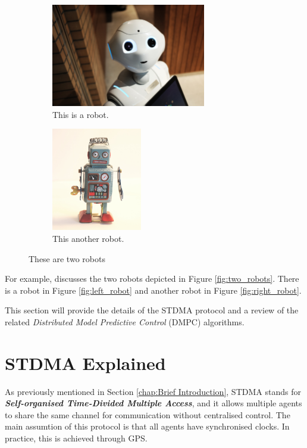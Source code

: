 {\begin{figure}[htb]
\centering
\begin{subfigure}[t]{.5\textwidth}
  \centering
  \includegraphics[height=4.5cm]{figures/Robot_1.jpg}
  \caption{\label{fig:left_robot} This is a robot.}
  \label{fig:theoretical}
\end{subfigure}%
\begin{subfigure}[t]{.5\textwidth}
  \centering
  \includegraphics[height=4.5cm]{figures/Robot_2.jpg}
  \caption{\label{fig:right_robot} This another robot.}
  \label{fig:practical}
\end{subfigure}
\caption{\label{fig:two_robots} These are two robots}
\label{fig:test}
\end{figure}

For example, \cite{Robots2020} discusses the two robots depicted in Figure \ref{fig:two_robots}. There is a robot in Figure \ref{fig:left_robot} and another robot in Figure \ref{fig:right_robot}.

}

This section will provide the details of the STDMA\cite{STDMA} protocol and a review of the related \textit{Distributed Model Predictive Control} (DMPC) algorithms.

\section{STDMA Explained}

\label{chap:STDMA Explained}

As previously mentioned in Section \ref{chap:Brief Introduction}, STDMA stands for \textbf{\textit{Self-organised Time-Divided Multiple Access}}, and it allows multiple agents to share the same channel for communication without centralised control.
The main assumtion of this protocol is that all agents have synchronised clocks. In practice, this is achieved through GPS\cite{STDMA_GPS}.

